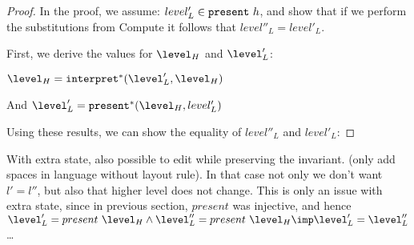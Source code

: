 \begin{proof}  In the proof, we assume: $level'_L \in {\tt present}~h$, and show that if we perform the substitutions from {\sc Compute} it follows that $level''_L = level'_L$.

First, we derive the values for $\level_H$ and $\level'_L$:

$\level_H = \interpret^* (\level'_{L},\level_{H})$



And $\level'_{L} = \present^* (\level_{H}, level'_{L})$


Using these results, we can show the equality of $level''_L$ and $level'_L$:

\end{proof}


With extra state, also possible to edit while preserving the invariant. (only add spaces in language without layout rule). In that case not only we don't want $l'=l''$, but also that higher level does not change. This is only an issue with extra state, since in previous section, $present$ was injective, and hence $\level_L' = present~\level_H \land \level_L'' = present~\level_H \imp \level'_L = \level''_L$ \dots {} 

